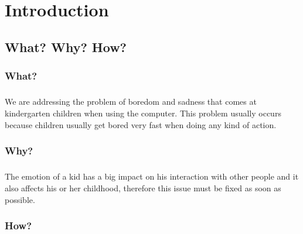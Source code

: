 \documentclass[runningheads,a4paper,11pt]{report}
\begin{document}
\tableofcontents

\newpage

\listoftables
\listoffigures

\newpage




\newpage



 


\chapter{Introduction}
\label{chapter:introduction}

\section{What? Why? How?}
\label{section:what}

\subsection{What?}
\label{subsection:what}
\paragraph{}
We are addressing the problem of boredom and sadness that comes at kindergarten children when using the computer. This problem usually occurs because children usually get bored very fast when doing any kind of action.

\subsection{Why?}
\label{subsection:what}
\paragraph{}

The emotion of a kid has a big impact on his interaction with other people and it also affects his or her childhood, therefore this issue must be fixed as soon as possible.

\subsection{How?}
\label{subsection:what}
\paragraph{}
\end{document}
